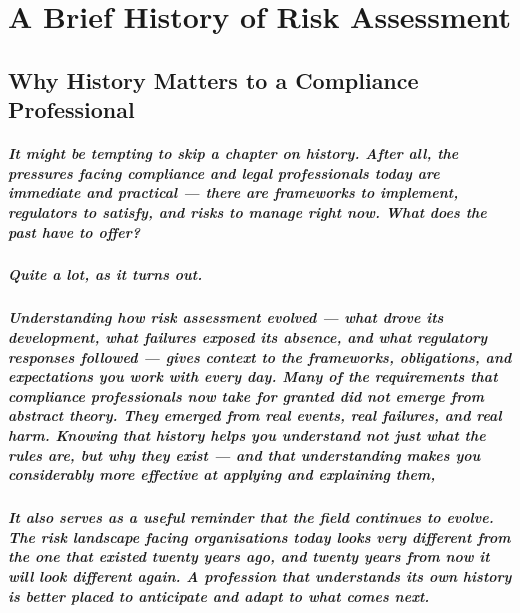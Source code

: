 \chapter{A Brief History of Risk Assessment}
\label{chap:A Brief History of Risk Assessment}

\section{Why History Matters to a Compliance Professional}
\paragraph{It might be tempting to skip a chapter on history. After all, the pressures facing compliance and legal professionals today are immediate and practical — there are frameworks to implement, regulators to satisfy, and risks to manage right now. What does the past have to offer?}
\paragraph{Quite a lot, as it turns out.}
\paragraph{Understanding how risk assessment evolved — what drove its development, what failures exposed its absence, and what regulatory responses followed — gives context to the frameworks, obligations, and expectations you work with every day. Many of the requirements that compliance professionals now take for granted did not emerge from abstract theory. They emerged from real events, real failures, and real harm. Knowing that history helps you understand not just \textit{what} the rules are, but \textit{why} they exist — and that understanding makes you considerably more effective at applying and explaining them,}
\paragraph{It also serves as a useful reminder that the field continues to evolve. The risk landscape facing organisations today looks very different from the one that existed twenty years ago, and twenty years from now it will look different again. A profession that understands its own history is better placed to anticipate and adapt to what comes next.}

